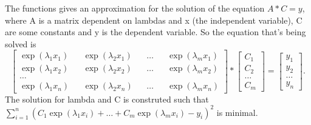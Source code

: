 \documentclass[12pt]{article}
\begin{document}
The functions gives an approximation for the solution of the equation $A * C = y$, where A is a matrix dependent on lambdas and x (the independent variable), C are some constants and y is the dependent variable. So the equation that's being solved is
\begin{equation*}
\begin{bmatrix} \exp{(\lambda_1 x_1)} && \exp{(\lambda_2 x_1)} && \dots && \exp{(\lambda_m x_1)} \\ \exp{(\lambda_1 x_2)} && \exp{(\lambda_2 x_2)} && \dots && \exp{(\lambda_m x_2)} \\ \dots \\ \exp{(\lambda_1 x_n)} && \exp{(\lambda_2 x_n)} && \dots && \exp{(\lambda_m x_n)} \end{bmatrix} * \begin{bmatrix} C_1 \\ C_2 \\ \dots \\ C_m \end{bmatrix} = \begin{bmatrix} y_1 \\ y_2 \\ \dots \\ y_n \end{bmatrix}.
\end{equation*}
The solution for lambda and C is construted such that $ \sum_{i=1}^{n} (C_1 \exp{(\lambda_1 x_i)} + \dots + C_m \exp{(\lambda_m x_i)} - y_i)^2$ is minimal.
\end{document}
